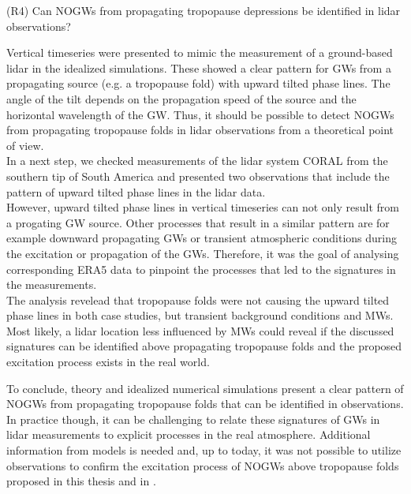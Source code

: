\begin{tcolorbox}[]
    (R4) Can NOGWs from propagating tropopause depressions be identified in lidar observations?
\end{tcolorbox}

Vertical timeseries were presented to mimic the measurement of a ground-based lidar in the idealized simulations. These showed a clear pattern for GWs from a propagating source (e.g. a tropopause fold) with upward tilted phase lines. The angle of the tilt depends on the propagation speed of the source and the horizontal wavelength of the GW. Thus, it should be possible to detect NOGWs from propagating tropopause folds in lidar observations from a theoretical point of view. \\
In a next step, we checked measurements of the lidar system CORAL from the southern tip of South America and presented two observations that include the pattern of upward tilted phase lines in the lidar data. \\
However, upward tilted phase lines in vertical timeseries can not only result from a progating GW source. Other processes that result in a similar pattern are for example downward propagating GWs or transient atmospheric conditions during the excitation or propagation of the GWs. Therefore, it was the goal of analysing corresponding ERA5 data to pinpoint the processes that led to the signatures in the measurements. \\
The analysis revelead that tropopause folds were not causing the upward tilted phase lines in both case studies, but transient background conditions and MWs. Most likely, a lidar location less influenced by MWs could reveal if the discussed signatures can be identified above propagating tropopause folds and the proposed excitation process exists in the real world.

To conclude, theory and idealized numerical simulations present a clear pattern of NOGWs from propagating tropopause folds that can be identified in observations. In practice though, it can be challenging to relate these signatures of GWs in lidar measurements to explicit processes in the real atmosphere. Additional information from models is needed and, up to today, it was not possible to utilize observations to confirm the excitation process of NOGWs above tropopause folds proposed in this thesis and in \textcite[]{dornbrack_stratospheric_2022}.
